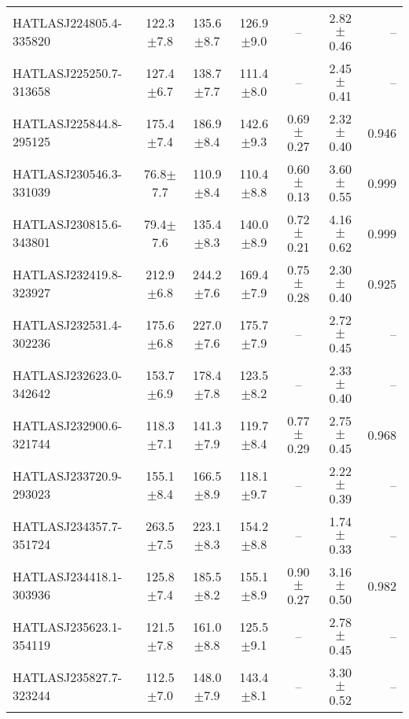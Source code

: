 \begin{landscape}
\begin{longtable}{lcccccr}
    HATLASJ224805.4-335820 & 122.3$\pm$7.8 & 135.6$\pm$8.7 & 126.9$\pm$9.0 & -- & 2.82$\pm$0.46 & -- \\
    HATLASJ225250.7-313658 & 127.4$\pm$6.7 & 138.7$\pm$7.7 & 111.4$\pm$8.0 & -- & 2.45$\pm$0.41 & -- \\
    HATLASJ225844.8-295125 & 175.4$\pm$7.4 & 186.9$\pm$8.4 & 142.6$\pm$9.3 & 0.69$\pm$0.27 & 2.32$\pm$0.40 & 0.946 \\
    HATLASJ230546.3-331039 & 76.8$\pm$7.7 & 110.9$\pm$8.4 & 110.4$\pm$8.8 & 0.60$\pm$0.13 & 3.60$\pm$0.55 & 0.999 \\
    HATLASJ230815.6-343801 & 79.4$\pm$7.6 & 135.4$\pm$8.3 & 140.0$\pm$8.9 & 0.72$\pm$0.21 & 4.16$\pm$0.62 & 0.999 \\
    HATLASJ232419.8-323927 & 212.9$\pm$6.8 & 244.2$\pm$7.6 & 169.4$\pm$7.9 & 0.75$\pm$0.28 & 2.30$\pm$0.40 & 0.925 \\
    HATLASJ232531.4-302236 & 175.6$\pm$6.8 & 227.0$\pm$7.6 & 175.7$\pm$7.9 & -- & 2.72$\pm$0.45 & -- \\
    HATLASJ232623.0-342642 & 153.7$\pm$6.9 & 178.4$\pm$7.8 & 123.5$\pm$8.2 & -- & 2.33$\pm$0.40 & -- \\
    HATLASJ232900.6-321744 & 118.3$\pm$7.1 & 141.3$\pm$7.9 & 119.7$\pm$8.4 & 0.77$\pm$0.29 & 2.75$\pm$0.45 & 0.968 \\
    HATLASJ233720.9-293023 & 155.1$\pm$8.4 & 166.5$\pm$8.9 & 118.1$\pm$9.7 & -- & 2.22$\pm$0.39 & -- \\
    HATLASJ234357.7-351724 & 263.5$\pm$7.5 & 223.1$\pm$8.3 & 154.2$\pm$8.8 & -- & 1.74$\pm$0.33 & -- \\
    HATLASJ234418.1-303936 & 125.8$\pm$7.4 & 185.5$\pm$8.2 & 155.1$\pm$8.9 & 0.90$\pm$0.27 & 3.16$\pm$0.50 & 0.982 \\
    HATLASJ235623.1-354119 & 121.5$\pm$7.8 & 161.0$\pm$8.8 & 125.5$\pm$9.1 & -- & 2.78$\pm$0.45 & -- \\
    HATLASJ235827.7-323244 & 112.5$\pm$7.0 & 148.0$\pm$7.9 & 143.4$\pm$8.1 & -- & 3.30$\pm$0.52 & -- \\
    \hline
\end{longtable}
\end{landscape}